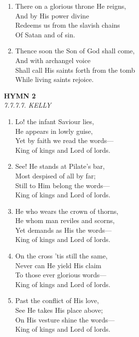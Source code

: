 \begin{enumerate}
    \item There on a glorious throne He reigns, \\
        And by His power divine \\
        Redeems us from the slavish chains \\
        Of Satan and of sin.

    \item Thence soon the Son of God shall come, \\
        And with archangel voice \\
        Shall call His saints forth from the tomb \\
        While living saints rejoice.

\end{enumerate}

\newpage
\begin{center}
    {\Large \textbf{HYMN 2}}
    \\
    \textit{7.7.7.7. KELLY}
\end{center}
\vspace{1em}

\begin{enumerate}
    \item Lo! the infant Saviour lies, \\
        He appears in lowly guise, \\
        Yet by faith we read the words--- \\
        King of kings and Lord of lords.

    \item See! He stands at Pilate's bar, \\
        Most despised of all by far; \\
        Still to Him belong the words--- \\
        King of kings and Lord of lords.

    \item He who wears the crown of thorns, \\
        He whom man reviles and scorns, \\
        Yet demands as His the words--- \\
        King of kings and Lord of lords.

    \item On the cross 'tis still the same, \\
        Never can He yield His claim \\
        To those ever glorious words--- \\
        King of kings and Lord of lords.

    \item Past the conflict of His love, \\
        See He takes His place above; \\
        On His vesture shine the words--- \\
        King of kings and Lord of lords.

\end{enumerate}

